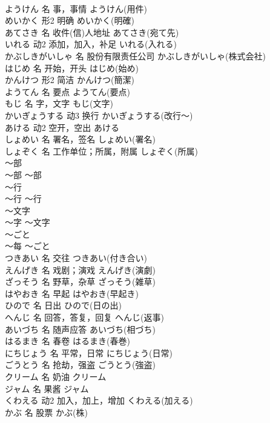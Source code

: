 \documentclass[8pt]{extreport}
\begin{document}
\begin{CJK}{UTF8}{min}
\\	ようけん	名	事，事情	ようけん(用件)	
\\	めいかく	形2	明确	めいかく(明確)	
\\	あてさき	名	收件(信)人地址	あてさき(宛て先)	
\\	いれる	动2	添加，加入，补足	いれる(入れる)	
\\	かぶしきがいしゃ	名	股份有限责任公司	かぶしきがいしゃ(株式会社)	
\\	はじめ	名	开始，开头	はじめ(始め)	
\\	かんけつ	形2	简洁	かんけつ(簡潔)	
\\	ようてん	名	要点	ようてん(要点)	
\\	もじ	名	字，文字	もじ(文字)	
\\	かいぎょうする	动3	换行	かいぎょうする(改行～)	
\\	あける	动2	空开，空出	あける	
\\	しょめい	名	署名，签名	しょめい(署名)	
\\	しょぞく	名	工作单位；所属，附属	しょぞく(所属)	
\\	～部	
\\	～部	～部	
\\	～行	
\\	～行	～行	
\\	～文字	
\\	～字	～文字	
\\	～ごと	
\\	～每	～ごと	
\\	つきあい	名	交往	つきあい(付き合い)	
\\	えんげき	名	戏剧；演戏	えんげき(演劇)	
\\	ざっそう	名	野草，杂草	ざっそう(雑草)	
\\	はやおき	名	早起	はやおき(早起き)	
\\	ひので	名	日出	ひので(日の出)	
\\	へんじ	名	回答，答复，回复	へんじ(返事)	
\\	あいづち	名	随声应答	あいづち(相づち)	
\\	はるまき	名	春卷	はるまき(春巻)	
\\	にちじょう	名	平常，日常	にちじょう(日常)	
\\	ごうとう	名	抢劫，强盗	ごうとう(強盗)	
\\	クリーム	名	奶油	クリーム	
\\	ジャム	名	果酱	ジャム	
\\	くわえる	动2	加入，加上，增加	くわえる(加える)	
\\	かぶ	名	股票	かぶ(株)	

\end{CJK}
\end{document}
